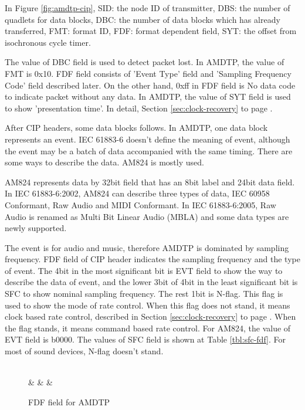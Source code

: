 \documentclass[onecolumn]{article}
\begin{document}
In Figure \ref{fig:amdtp-cip}, SID: the node ID of transmitter, DBS: the number of quadlets for data blocks, DBC: the number of data blocks which has already transferred, FMT: format ID, FDF: format dependent field, SYT: the offset from isochronous cycle timer.

The value of DBC field is used to detect packet lost. In AMDTP, the value of FMT is 0x10. FDF field consists of 'Event Type' field and 'Sampling Frequency Code' field described later. On the other hand, 0xff in FDF field is No data code to indicate packet without any data. In AMDTP, the value of SYT field is used to show 'presentation time'. In detail, Section \ref{sec:clock-recovery} to page \pageref{sec:clock-recovery}.

After CIP headers, some data blocks follows. In AMDTP, one data block represents an event. IEC 61883-6\cite{iec61883-6-1, iec61883-6-2} doesn't define the meaning of event, although the event may be a batch of data accompanied with the same timing. There are some ways to describe the data. AM824 is mostly used.

AM824 represents data by 32bit field that has an 8bit label and 24bit data field. In IEC 61883-6:2002\cite{iec61883-6-1}, AM824 can describe three types of data, IEC 60958 Conformant, Raw Audio and MIDI Conformant. In IEC 61883-6:2005\cite{iec61883-6-2}, Raw Audio is renamed as Multi Bit Linear Audio (MBLA) and some data types are newly supported.

The event is for audio and music, therefore AMDTP is dominated by sampling frequency. FDF field of CIP header indicates the sampling frequency and the type of event. The 4bit in the most significant bit is EVT field to show the way to describe the data of event, and the lower 3bit of 4bit in the least significant bit is SFC to show nominal sampling frequency. The rest 1bit is N-flag. This flag is used to show the mode of rate control. When this flag does not stand, it means clock based rate control, described in Section \ref{sec:clock-recovery} to page \pageref{sec:clock-recovery}. When the flag stands, it means command based rate control\cite{iec61883-6-2, avc-rate-control}. For AM824, the value of EVT field is b0000. The values of SFC field is shown at Table \ref{tbl:sfc-fdf}. For most of sound devices, N-flag doesn't stand.

\begin{figure}[H]
\centering
\begin{bytefield}[bitwidth=auto,endianness=big]{8}
	 \\
	 &
	 &
	 &
\end{bytefield}
\caption{FDF field for AMDTP}
\label{amdtp-fdf}
\end{figure}
\end{document}
